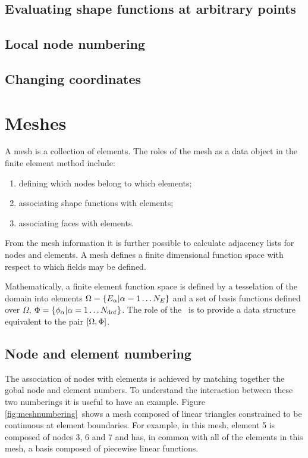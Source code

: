 \documentclass[a4paper, 11pt]{book}
\newcommand{\targetlabel}[1]{\hypertarget{#1}{}\label{#1}}
\begin{document}
\section{Evaluating shape functions at arbitrary points}

\section{Local node numbering}


\section{Changing coordinates}



\chapter{Meshes}\targetlabel{chap:meshes}

A mesh is a collection of elements. The roles of the mesh as a data object in
the finite element method include:
\begin{enumerate}
\item defining which nodes belong to which elements;
\item associating shape functions with elements;
\item associating faces with elements.
\end{enumerate}
From the mesh information it is further possible to calculate adjacency
lists for nodes and elements. A mesh defines a finite dimensional function
space with respect to which fields may be defined.

Mathematically, a finite element function space is defined by a tesselation
of the domain into elements $\Omega=\{E_\alpha|\alpha=1\ldots N_E\}$ and a set of basis
functions defined over $\Omega$, $\Phi=\{\phi_\alpha|\alpha=1\ldots N_\mathrm{dof}\}$. The role of
the \meshtype\ is to provide a data structure equivalent to the pair
$[\Omega,\Phi]$.

\section{Node and element numbering}

The association of nodes with elements is achieved by matching together the
gobal node and element numbers. To understand the interaction between these
two numberings it is useful to have an example. Figure \ref{fig:meshnumbering}\
shows a mesh composed of linear triangles constrained to be continuous at
element boundaries. For example, in this mesh, element 5 is composed of
nodes 3, 6 and 7 and has, in common with all of the elements in this mesh, a
basis composed of piecewise linear functions.
\end{document}
